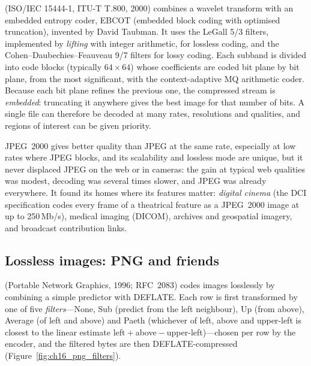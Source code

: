 
 (ISO/IEC 15444-1, ITU-T T.800, 2000) combines a wavelet transform with an
embedded entropy coder, EBCOT (embedded block coding with optimised truncation), invented by David
Taubman. It uses the LeGall 5/3 filters, implemented by \emph{lifting} with integer arithmetic, for
lossless coding, and the Cohen--Daubechies--Feauveau 9/7 filters for lossy coding. Each subband is
divided into code blocks (typically $64\times64$) whose coefficients are coded bit plane by bit plane,
from the most significant, with the context-adaptive MQ arithmetic coder. Because each bit plane
refines the previous one, the compressed stream is \emph{embedded}: truncating it anywhere gives the
best image for that number of bits. A single file can therefore be decoded at many rates, resolutions
and qualities, and regions of interest can be given priority.

JPEG~2000 gives better quality than JPEG at the same rate, especially at low rates where JPEG blocks,
and its scalability and lossless mode are unique, but it never displaced JPEG on the web or in cameras:
the gain at typical web qualities was modest, decoding was several times slower, and JPEG was already
everywhere. It found its homes where its features matter: \emph{digital cinema} (the DCI specification
codes every frame of a theatrical feature as a JPEG~2000 image at up to 250\,Mb/s), medical imaging
(DICOM), archives and geospatial imagery, and broadcast contribution links.

\subsection{Lossless images: PNG and friends}
\label{sec:ch16:png}

 (Portable Network Graphics, 1996; RFC~2083) codes images losslessly by combining a simple
predictor with DEFLATE. Each row is first transformed by one of five \emph{filters}---None, Sub (predict
from the left neighbour), Up (from above), Average (of left and above) and Paeth (whichever of left,
above and upper-left is closest to the linear estimate left${}+{}$above${}-{}$upper-left)---chosen per row
by the encoder, and the filtered bytes are then DEFLATE-compressed (Figure~\ref{fig:ch16_png_filters}).

